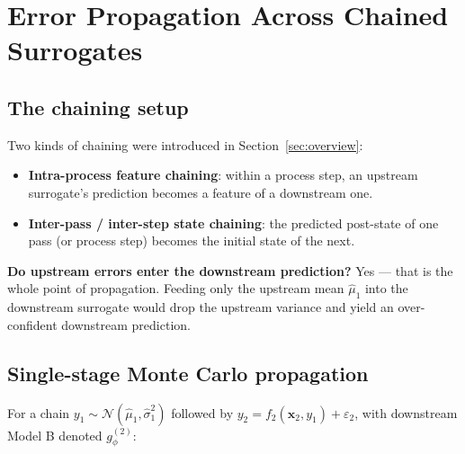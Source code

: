 \documentclass[11pt,a4paper]{article}
\begin{document}
\newpage
\section{Error Propagation Across Chained Surrogates}
\label{sec:propagation}

\subsection{The chaining setup}

Two kinds of chaining were introduced in Section~\ref{sec:overview}:
\begin{itemize}
    \item \textbf{Intra-process feature chaining}: within a process step, an upstream surrogate's prediction becomes a feature of a downstream one.
    \item \textbf{Inter-pass / inter-step state chaining}: the predicted post-state of one pass (or process step) becomes the initial state of the next.
\end{itemize}

\begin{intuitionbox}
\textbf{Do upstream errors enter the downstream prediction?} Yes --- that is the whole point of propagation. Feeding only the upstream mean $\hat\mu_1$ into the downstream surrogate would drop the upstream variance and yield an over-confident downstream prediction.
\end{intuitionbox}

\subsection{Single-stage Monte Carlo propagation}
\label{sec:mc-single}

For a chain $y_1 \sim \mathcal{N}(\hat\mu_1, \hat\sigma_1^2)$ followed by $y_2 = f_2(\bm x_2, y_1) + \varepsilon_2$, with downstream Model B denoted $g_\phi^{(2)}$:
\end{document}
